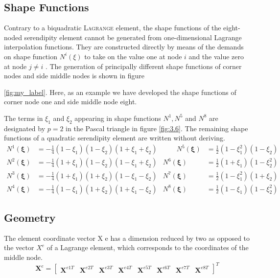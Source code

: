 \subsection{Shape Functions}
Contrary to a biquadratic \textsc{Lagrange} element, the shape functions of the eight-noded serendipity element cannot be generated from one-dimensional Lagrange interpolation functions. They
are constructed directly by means of the demands on shape function $N^i(\xi)$ to take on the value
one at node $i$ and the value zero at node $j \ne i$ . The generation of principally different shape functions of corner nodes and side middle nodes is shown in figure {\ref{fig:my_label}.
Here, as an example we have developed the shape functions of corner node one and side middle node eight.

The terms in $\xi_ 1$ and $\xi_ 2 $ appearing in shape functions $ N^ 1 , N^ 5$ and $N^ 8$ are designated by $p = 2$
in the Pascal triangle in figure \ref{fig:3.6}. The remaining shape functions of a quadratic serendipity element are written without deriving.
\begin{equation}
 \begin{aligned} N^{1}(\boldsymbol{\xi}) &=-\frac{1}{4}\left(1-\xi_{1}\right)\left(1-\xi_{2}\right)\left(1+\xi_{1}+\xi_{2}\right) & \qquad N^{5}(\boldsymbol{\xi}) &=\frac{1}{2}\left(1-\xi_{1}^{2}\right)\left(1-\xi_{2}\right) \\ N^{2}(\boldsymbol{\xi}) &=-\frac{1}{4}\left(1+\xi_{1}\right)\left(1-\xi_{2}\right)\left(1-\xi_{1}+\xi_{2}\right) & N^{6}(\boldsymbol{\xi}) &=\frac{1}{2}\left(1+\xi_{1}\right)\left(1-\xi_{2}^{2}\right) \\ N^{3}(\boldsymbol{\xi}) &=-\frac{1}{4}\left(1+\xi_{1}\right)\left(1+\xi_{2}\right)\left(1-\xi_{1}-\xi_{2}\right) & N^{7}(\boldsymbol{\xi}) &=\frac{1}{2}\left(1-\xi_{1}^{2}\right)\left(1+\xi_{2}\right) \\ N^{4}(\boldsymbol{\xi}) &=-\frac{1}{4}\left(1-\xi_{1}\right)\left(1+\xi_{2}\right)\left(1+\xi_{1}-\xi_{2}\right) & N^{8}(\boldsymbol{\xi}) &=\frac{1}{2}\left(1-\xi_{1}\right)\left(1-\xi_{2}^{2}\right) \end{aligned} 
\end{equation}
\subsection{Geometry}
The element coordinate vector X e has a dimension reduced by two as opposed to the vector $X^e$
of a Lagrange element, which corresponds to the coordinates of the middle node.
\begin{equation}
 \boldsymbol{X}^{e}=\left[\begin{array}{llllllll}\boldsymbol{X}^{e 1T} & \boldsymbol{X}^{e 2 T} & \boldsymbol{X}^{e 3 T} & \boldsymbol{X}^{e 4 T} & \boldsymbol{X}^{e 5 T} & \boldsymbol{X}^{\epsilon 6 T} & \boldsymbol{X}^{e 7 T} & \boldsymbol{X}^{e 8 T}\end{array}\right]^{T} 
 \label{eqn:3.151} 
\end{equation}

}
